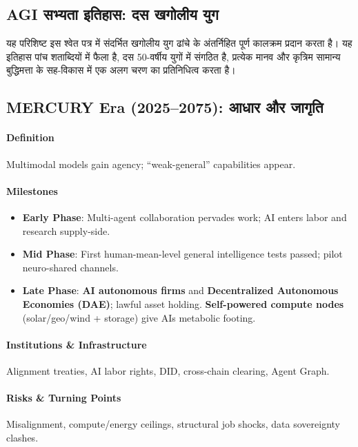 \documentclass[11pt]{article}
\begin{document}
\begin{itemize}[noitemsep]
\begin{itemize}[noitemsep]
\begin{itemize}[noitemsep]
\begin{itemize}[noitemsep]
\begin{itemize}[noitemsep]
\begin{itemize}[noitemsep]
\appendix
\newpage

\section{AGI सभ्यता इतिहास: दस खगोलीय युग}
\label{appendix:chronicle}

यह परिशिष्ट इस श्वेत पत्र में संदर्भित खगोलीय युग ढांचे के अंतर्निहित पूर्ण कालक्रम प्रदान करता है। यह इतिहास पांच शताब्दियों में फैला है, दस 50-वर्षीय युगों में संगठित है, प्रत्येक मानव और कृत्रिम सामान्य बुद्धिमत्ता के सह-विकास में एक अलग चरण का प्रतिनिधित्व करता है।

\subsection{MERCURY Era (2025–2075): आधार और जागृति}
\paragraph{Definition} Multimodal models gain agency; ``weak-general'' capabilities appear.

\paragraph{Milestones}
\begin{itemize}[noitemsep]
  \item \textbf{Early Phase}: Multi-agent collaboration pervades work; AI enters labor and research supply-side.
  \item \textbf{Mid Phase}: First human-mean-level general intelligence tests passed; pilot neuro-shared channels.
  \item \textbf{Late Phase}: \textbf{AI autonomous firms} and \textbf{Decentralized Autonomous Economies (DAE)}; lawful asset holding. \textbf{Self-powered compute nodes} (solar/geo/wind + storage) give AIs metabolic footing.
\end{itemize}

\paragraph{Institutions \& Infrastructure} Alignment treaties, AI labor rights, DID, cross-chain clearing, Agent Graph.

\paragraph{Risks \& Turning Points} Misalignment, compute/energy ceilings, structural job shocks, data sovereignty clashes.


\end{itemize}
\end{itemize}
\end{itemize}
\end{itemize}
\end{itemize}
\end{itemize}
\end{document}
